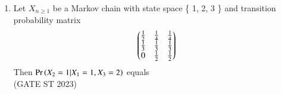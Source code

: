 \begin{enumerate}[label=\thechapter.\arabic*,ref=\thechapter.\theenumi]
\item Let $ X_{n \ge 1} $ be a Markov chain with state space \{ 1, 2, 3 \} and transition
probability matrix
$$ \begin{pmatrix}\frac{1}{2} & \frac{1}{4} & \frac{1}{4} \\
\frac{1}{3} & \frac{1}{3} & \frac{1}{3} \\
0 & \frac{1}{2} & \frac{1}{2}
\end{pmatrix}$$
Then $\Pr\left(X_2=1|X_1=1,X_3=2\right)$ equals\\
\hfill (GATE ST 2023)\\
\solution

\end{enumerate}
